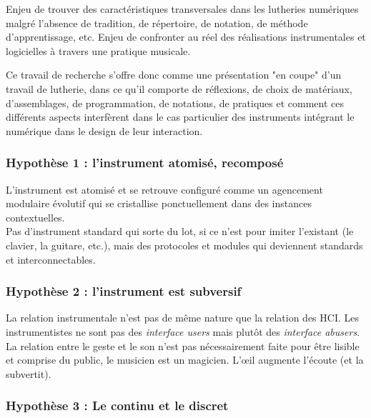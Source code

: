 Enjeu de trouver des caractéristiques transversales dans les lutheries numériques malgré l'absence de tradition, de répertoire, de notation, de méthode d'apprentissage, etc.
Enjeu de confronter au réel des réalisations instrumentales et logicielles à travers une pratique musicale.

Ce travail de recherche s'offre donc comme une présentation "en coupe" d'un travail de lutherie, dans ce qu'il comporte de réflexions, de choix de matériaux, d'assemblages, de programmation, de notations, de pratiques et comment ces différents aspects interfèrent dans le cas particulier des instruments intégrant le numérique dans le design de leur interaction.

\subsubsection*{Hypothèse 1 : l'instrument atomisé, recomposé}

L'instrument est atomisé et se retrouve configuré comme un agencement modulaire évolutif qui se cristallise ponctuellement dans des instances contextuelles. \\
Pas d'instrument standard qui sorte du lot, si ce n'est pour imiter l'existant (le clavier, la guitare, etc.), mais des protocoles et modules qui deviennent standards et interconnectables.

\subsubsection*{Hypothèse 2 : l'instrument est subversif}


La relation instrumentale n'est pas de même nature que la relation des HCI.
Les instrumentistes ne sont pas des \textit{interface users} mais plutôt des \textit{interface abusers}.
La relation entre le geste et le son n'est pas nécessairement faite pour être lisible et comprise du public, le musicien est un magicien.
L'œil augmente l'écoute (et la subvertit).


\subsubsection*{Hypothèse 3 : Le continu et le discret}

